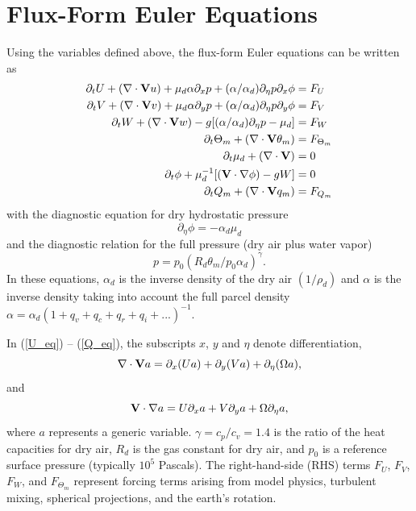 \section{Flux-Form Euler Equations}

Using the variables defined above, the flux-form Euler equations can be
written as
%
\begin{align}
\partial_t U + (\nabla \cdot {\bf V}  u)
+ \mu_d \alpha \partial_x p 
+ (\alpha/\alpha_d) \partial_\eta p \partial_x \phi & = F_U \label{U_eq}\\
%
\partial_t V + (\nabla \cdot {\bf V} v ) 
+ \mu_d \alpha \partial_y p
+ (\alpha/\alpha_d) \partial_\eta p \partial_y \phi & = F_V \label{V_eq}\\
%
\partial_t W + (\nabla \cdot {\bf V} w )  
- g [ (\alpha/\alpha_d) \partial_\eta p - \mu_d ] & = F_W \label{W_eq}\\
%
\partial_t \Theta_m + (\nabla \cdot {\bf V} \theta_m )  & = F_{\Theta_m} \label{T_eq}\\
%
\partial_t \mu_d + (\nabla \cdot {\bf V} ) & = 0 \label{mu_eq}\\
%
\partial_t \phi + \mu_d^{-1} [({\bf V} \cdot \nabla \phi ) - gW ] & = 0 \label{phi_eq}\\
%
\partial_t Q_m + (\nabla \cdot {\bf V} q_m ) & = F_{Q_m} \label{Q_eq}
%
\end{align}
\noindent
with the diagnostic equation for dry hydrostatic pressure
%
\begin{equation}
\partial_\eta \phi  = - \alpha_d \mu_d \label{pd_eq}
\end{equation}
%
\noindent
and the diagnostic relation for the 
full pressure (dry air plus water vapor)
%
\begin{equation}
p = p_0 (R_d \theta_m / p_0 \alpha_d)^{\gamma}.
\label{ideal_gas_law}
\end{equation}
%
\noindent
In these equations, $\alpha_d$ is the inverse density of the dry air
$(1/\rho_d)$ and $\alpha$ is the inverse density taking into account the
full parcel density 
$\alpha = \alpha_d ( 1 + q_v + q_c + q_r + q_i + ...)^{-1}$. 

In (\ref{U_eq}) -- (\ref{Q_eq}), the subscripts 
$x$, $y$ and $\eta$ denote
differentiation, 
%
\begin{equation}
\nabla \cdot {\bf V } a = \partial_x (Ua) + 
                           \partial_y (Va) + 
                           \partial_\eta (\Omega a),
\notag
\end{equation}
%
\noindent
and
%
\begin{equation}
{\bf V} \cdot \nabla a = U \partial_x a + 
                           V \partial_y a + 
                           \Omega \partial_\eta a,
\notag
\end{equation}
%
\noindent
where $a$ represents a generic variable.  
$\gamma=c_p/c_v = 1.4$ is the ratio of
the heat capacities for dry air, $R_d$ is the gas constant for dry
air, and $p_0$ is a reference surface pressure (typically $10^5$ Pascals).
The right-hand-side (RHS) terms $F_U$, $F_V$, $F_W$, and
$F_{\Theta_m}$ represent forcing terms arising from model physics,
turbulent mixing, spherical projections, and the earth's rotation.

